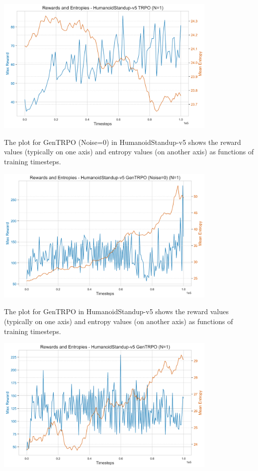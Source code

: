 \documentclass{svproc}
\begin{document}
\begin{center}
\includegraphics[width=0.8\textwidth]{graph_HumanoidStandup-v5_trpo_rewards_entropies.png}
\end{center}

The plot for GenTRPO (Noise=0) in HumanoidStandup-v5 shows the reward values (typically on one axis) and entropy values (on another axis) as functions of training timesteps.

\begin{center}
\includegraphics[width=0.8\textwidth]{graph_HumanoidStandup-v5_gentrpo_rewards_entropies.png}
\end{center}

The plot for GenTRPO in HumanoidStandup-v5 shows the reward values (typically on one axis) and entropy values (on another axis) as functions of training timesteps.

\begin{center}
\includegraphics[width=0.8\textwidth]{graph_HumanoidStandup-v5_gentrpo-ne_rewards_entropies.png}
\end{center}
\end{document}
